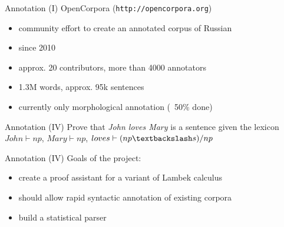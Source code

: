 \documentclass{beamer}
\begin{document}
\begin{frame}{Annotation (I)}
OpenCorpora (\texttt{http://opencorpora.org})\\
\bigskip
\begin{itemize}
    \item community effort to create an annotated corpus of Russian
    \item since 2010
    \item approx. 20 contributors, more than 4000 annotators
    \item 1.3M words, approx. 95k sentences
    \item currently only morphological annotation (~50\% done)
\end{itemize}
\end{frame}


\begin{frame}{Annotation (IV)}
Prove that \textit{John loves Mary} is a sentence given the lexicon\\
\medskip
$John \vdash np$, $Mary \vdash np$, $loves \vdash (np \textbackslash s)/np$

\begin{prooftree}
\end{prooftree}
\end{frame}

\begin{frame}{Annotation (IV)}
Goals of the project:\\
\bigskip
\begin{itemize}
    \item create a proof assistant for a variant of Lambek calculus
    \item should allow rapid syntactic annotation of existing corpora
    \item build a statistical parser
\end{itemize}
\end{frame}
\end{document}
